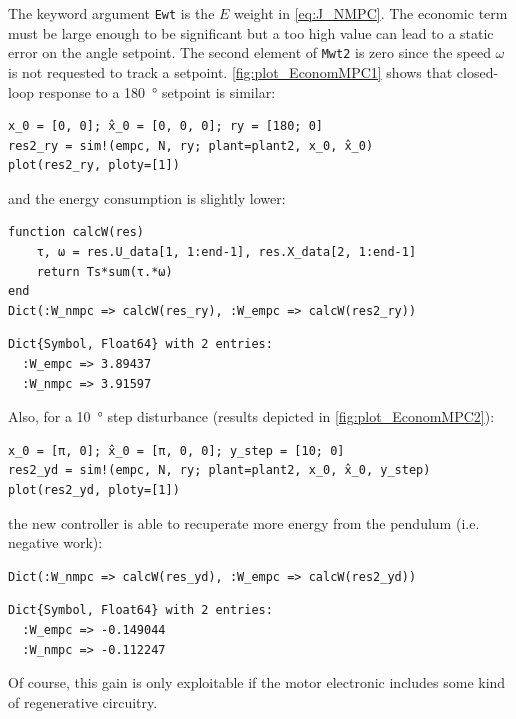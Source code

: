 The keyword argument \texttt{Ewt} is the $E$ weight in \eqref{eq:J_NMPC}. The economic term must be large enough to be significant but a too high value can lead to a static error on the angle setpoint. The second element of \texttt{Mwt2} is zero since the speed $\omega$ is not requested to track a setpoint. \cref{fig:plot_EconomMPC1} shows that closed-loop response to a \SI{180}{\degree} setpoint is similar:
\begin{verbatim}
x_0 = [0, 0]; x̂_0 = [0, 0, 0]; ry = [180; 0]
res2_ry = sim!(empc, N, ry; plant=plant2, x_0, x̂_0)
plot(res2_ry, ploty=[1])
\end{verbatim}
and the energy consumption is slightly lower:
\begin{verbatim}
function calcW(res)
    τ, ω = res.U_data[1, 1:end-1], res.X_data[2, 1:end-1]
    return Ts*sum(τ.*ω)
end
Dict(:W_nmpc => calcW(res_ry), :W_empc => calcW(res2_ry))
\end{verbatim}
\spacerepl
\begin{verbatim}
Dict{Symbol, Float64} with 2 entries:
  :W_empc => 3.89437
  :W_nmpc => 3.91597
\end{verbatim}
Also, for a \SI{10}{\degree} step disturbance (results depicted in \cref{fig:plot_EconomMPC2}):
\begin{verbatim}
x_0 = [π, 0]; x̂_0 = [π, 0, 0]; y_step = [10; 0]
res2_yd = sim!(empc, N, ry; plant=plant2, x_0, x̂_0, y_step)
plot(res2_yd, ploty=[1])
\end{verbatim}
the new controller is able to recuperate more energy from the pendulum (i.e. negative work):
\begin{verbatim}
Dict(:W_nmpc => calcW(res_yd), :W_empc => calcW(res2_yd))
\end{verbatim}
\spacerepl
\begin{verbatim}
Dict{Symbol, Float64} with 2 entries:
  :W_empc => -0.149044
  :W_nmpc => -0.112247
\end{verbatim}
Of course, this gain is only exploitable if the motor electronic includes some kind of regenerative circuitry.

